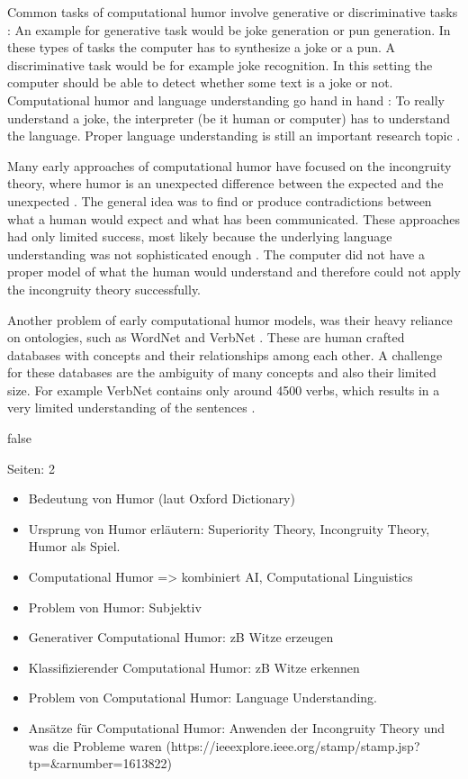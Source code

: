 \documentclass[draft,final,oneside]{vutinfth} %
\begin{document}
Common tasks of computational humor involve generative or discriminative tasks \cite{HumoristBot}\cite{Yang2015HumorRA}: An example for generative task would be joke generation or pun generation. In these types of tasks the computer has to synthesize a joke or a pun. A discriminative task would be for example joke recognition. In this setting the computer should be able to detect whether some text is a joke or not. Computational humor and language understanding go hand in hand \cite{Yang2015HumorRA}: To really understand a joke, the interpreter (be it human or computer) has to understand the language. Proper language understanding is still an important research topic \cite{elmo}\cite{bert}.

Many early approaches of computational humor have focused on the incongruity theory, where humor is an unexpected difference between the expected and the unexpected \cite{comphumorsummary}. The general idea was to find or produce contradictions between what a human would expect and what has been communicated. These approaches had only limited success, most likely because the underlying language understanding was not sophisticated enough \cite{comphumorsummary}. The computer did not have a proper model of what the human would understand and therefore could not apply the incongruity theory successfully.

Another problem of early computational humor models, was their heavy reliance on ontologies, such as WordNet and VerbNet \cite{comphumorsummary}\cite{wordnet}. These are human crafted databases with concepts and their relationships among each other. A challenge for these databases are the ambiguity of many concepts and also their limited size. For example VerbNet contains only around 4500 verbs, which results in a very limited understanding of the sentences \cite{verbnet}. 	


\if false

Seiten: 2
\begin{itemize}
\item Bedeutung von Humor (laut Oxford Dictionary)
\item Ursprung von Humor erläutern: Superiority Theory, Incongruity Theory, Humor als Spiel.
\item Computational Humor => kombiniert AI, Computational Linguistics
\item Problem von Humor: Subjektiv
\item Generativer Computational Humor: zB Witze erzeugen
\item Klassifizierender Computational Humor: zB Witze erkennen
\item Problem von Computational Humor: Language Understanding.
\item Ansätze für Computational Humor: Anwenden der Incongruity Theory und was die Probleme waren (https://ieeexplore.ieee.org/stamp/stamp.jsp?tp=\&arnumber=1613822)
\end{itemize}
\fi
\end{document}
